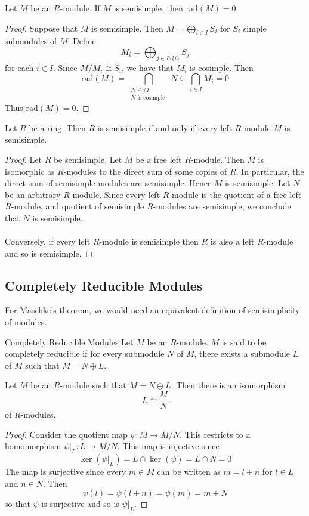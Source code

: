 \documentclass[a4paper]{article}
\begin{document}
\begin{lmm}{}{} Let $M$ be an $R$-module. If $M$ is semisimple, then $\text{rad}(M)=0$. \tcbline
\begin{proof}
Suppose that $M$ is semisimple. Then $M=\bigoplus_{i\in I}S_i$ for $S_i$ simple submodules of $M$. Define $$M_i=\bigoplus_{j\in I\setminus\{i\}}S_j$$ for each $i\in I$.  Since $M/M_i\cong S_i$, we have that $M_i$ is cosimple. Then $$\text{rad}(M)=\bigcap_{\substack{N\leq M\\N\text{ is cosimple }}}N\subseteq\bigcap_{i\in I}M_i=0$$ Thus $\text{rad}(M)=0$. 
\end{proof}
\end{lmm}

\begin{prp}{}{} Let $R$ be a ring. Then $R$ is semisimple if and only if every left $R$-module $M$ is semisimple. \tcbline
\begin{proof}
Let $R$ be semisimple. Let $M$ be a free left $R$-module. Then $M$ is isomorphic as $R$-modules to the direct sum of some copies of $R$. In particular, the direct sum of semisimple modules are semisimple. Hence $M$ is semisimple. Let $N$ be an arbitrary $R$-module. Since every left $R$-module is the quotient of a free left $R$-module, and quotient of semisimple $R$-modules are semisimple, we conclude that $N$ is semisimple. \\~\\

Conversely, if every left $R$-module is semisimple then $R$ is also a left $R$-module and so is semisimple. 
\end{proof}
\end{prp}

\subsection{Completely Reducible Modules}
For Maschke's theorem, we would need an equivalent definition of semisimplicity of modules. 

\begin{defn}{Completely Reducible Modules}{} Let $M$ be an $R$-module. $M$ is said to be completely reducible if for every submodule $N$ of $M$, there exists a submodule $L$ of $M$ such that $M=N\oplus L$. 
\end{defn}

\begin{prp}{}{} Let $M$ be an $R$-module such that $M=N\oplus L$. Then there is an isomorphism $$L\cong\frac{M}{N}$$ of $R$-modules. \tcbline
\begin{proof}
Consider the quotient map $\psi:M\to M/N$. This restricts to a homomorphism $\psi|_L:L\to M/N$. This map is injective since $$\ker(\psi|_L)=L\cap\ker(\psi)=L\cap N=0$$ The map is surjective since every $m\in M$ can be written as $m=l+n$ for $l\in L$ and $n\in N$. Then $$\psi(l)=\psi(l+n)=\psi(m)=m+N$$ so that $\psi$ is surjective and so is $\psi|_L$. 
\end{proof}
\end{prp}
\end{document}
